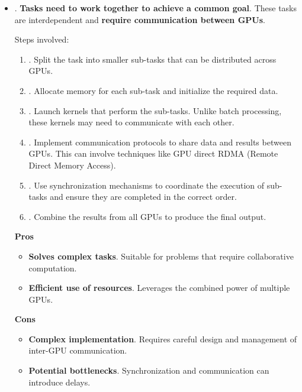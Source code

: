 \begin{itemize}
  \item {}. \textbf{Tasks need to work together to achieve a common goal}. These tasks are interdependent and \textbf{require communication between GPUs}.

  Steps involved:
  \begin{enumerate}
    \item {}. Split the task into smaller sub-tasks that can be distributed across GPUs.
    \item {}. Allocate memory for each sub-task and initialize the required data.
    \item {}. Launch kernels that perform the sub-tasks. Unlike batch processing, these kernels may need to communicate with each other.
    \item {}. Implement communication protocols to share data and results between GPUs. This can involve techniques like GPU direct RDMA (Remote Direct Memory Access).
    \item {}. Use synchronization mechanisms to coordinate the execution of sub-tasks and ensure they are completed in the correct order.
    \item {}. Combine the results from all GPUs to produce the final output.
  \end{enumerate}

  \begin{flushleft}
    \textcolor{Green3}{ \textbf{Pros}}
  \end{flushleft}
  \begin{itemize}[label=\textcolor{Green3}{}]
    \item \textcolor{Green3}{\textbf{Solves complex tasks}}. Suitable for problems that require collaborative computation.
    \item \textcolor{Green3}{\textbf{Efficient use of resources}}. Leverages the combined power of multiple GPUs.
  \end{itemize}
  \begin{flushleft}
    \textcolor{Red2}{ \textbf{Cons}}
  \end{flushleft}
  \begin{itemize}[label=\textcolor{Red2}{}]
    \item \textcolor{Red2}{\textbf{Complex implementation}}. Requires careful design and management of inter-GPU communication.
    \item \textcolor{Red2}{\textbf{Potential bottlenecks}}. Synchronization and communication can introduce delays.
  \end{itemize}
\end{itemize}
